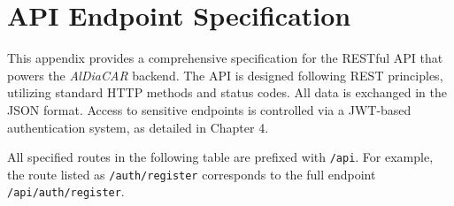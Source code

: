 \chapter{API Endpoint Specification}

This appendix provides a comprehensive specification for the RESTful API that powers the \textit{AlDiaCAR} backend. The API is designed following REST principles, utilizing standard HTTP methods and status codes. All data is exchanged in the JSON format. Access to sensitive endpoints is controlled via a JWT-based authentication system, as detailed in Chapter 4.

\textgap

All specified routes in the following table are prefixed with \texttt{/api}. For example, the route listed as \texttt{/auth/register} corresponds to the full endpoint \texttt{/api/auth/register}.

